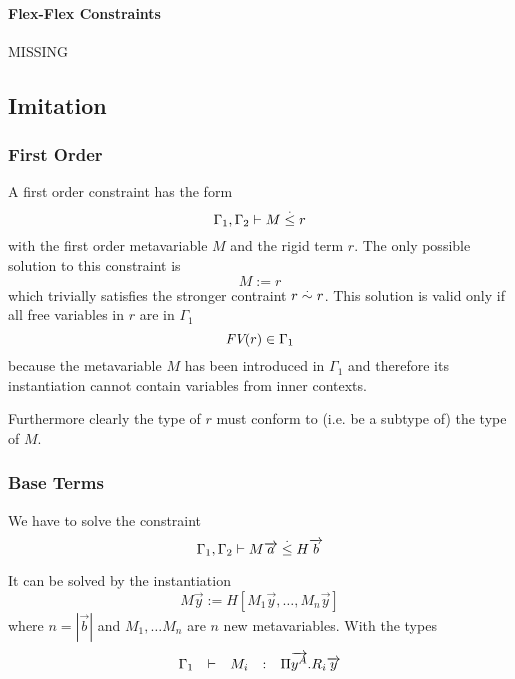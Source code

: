 \paragraph{Flex-Flex Constraints}

MISSING














\subsection{Imitation}




\subsubsection {First Order}



A first order constraint has the form
$$
    \Gamma_1, \Gamma_2 \vdash M \stackrel . \le r
$$
with the first order metavariable $M$ and the rigid term $r$. The only possible
solution to this constraint is
$$
    M := r
$$
which trivially satisfies the stronger contraint $r \stackrel . \sim r$. This solution is
valid only if all free variables in $r$ are in $\Gamma_1$
$$
    {\text{\it FV}}(r) \in \Gamma_1
$$
because the metavariable $M$ has been introduced in $\Gamma_1$ and therefore its
instantiation cannot contain variables from inner contexts.

Furthermore clearly the type of $r$ must conform to (i.e. be a subtype of) the
type of $M$.







\subsubsection {Base Terms}

We have to solve the constraint
$$
    \Gamma_1, \Gamma_2 \vdash M {\overrightarrow {a}} \stackrel . \le H {\overrightarrow {b}}
$$

It can be solved by the instantiation
$$
    M \vec y := H [M_1 \vec y, \ldots, M_n \vec y]
$$
where $n = |\vec b|$ and $M_1, \ldots M_n$ are $n$ new metavariables. With the
types
$$
    \begin{array}{lllll} 
        \Gamma_1 &\vdash& M_i &:& \Pi {\overrightarrow {y^A}}. R_i {\overrightarrow {y}}
     \end{array}
$$

